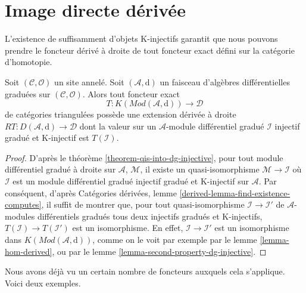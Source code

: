 \section{Image directe dérivée}
\label{section-derived-pushforward}

\noindent
L'existence de suffisamment d'objets K-injectifs garantit que nous pouvons prendre le foncteur dérivé à droite de tout foncteur exact défini sur la catégorie d'homotopie.

\begin{lemma}
\label{lemma-right-derived}
Soit $(\mathcal{C}, \mathcal{O})$ un site annelé.
Soit $(\mathcal{A}, \text{d})$ un faisceau d'algèbres différentielles graduées sur $(\mathcal{C}, \mathcal{O})$.
Alors tout foncteur exact
$$
T : K(\textit{Mod}(\mathcal{A}, \text{d})) \longrightarrow \mathcal{D}
$$
de catégories triangulées possède une extension dérivée à droite $RT : D(\mathcal{A}, \text{d}) \to \mathcal{D}$ dont la valeur sur un $\mathcal{A}$-module différentiel gradué $\mathcal{I}$ injectif gradué et K-injectif est $T(\mathcal{I})$.
\end{lemma}

\begin{proof}
D'après le théorème \ref{theorem-qis-into-dg-injective}, pour tout module différentiel gradué à droite sur $\mathcal{A}$, $\mathcal{M}$, il existe un quasi-isomorphisme $\mathcal{M} \to \mathcal{I}$ où $\mathcal{I}$ est un module différentiel gradué injectif gradué et K-injectif sur $\mathcal{A}$.
Par conséquent, d'après Catégories dérivées, lemme \ref{derived-lemma-find-existence-computes}, il suffit de montrer que, pour tout quasi-isomorphisme $\mathcal{I} \to \mathcal{I}'$ de $\mathcal{A}$-modules différentiels gradués tous deux injectifs gradués et K-injectifs, $T(\mathcal{I}) \to T(\mathcal{I}')$ est un isomorphisme.
En effet, $\mathcal{I} \to \mathcal{I}'$ est un isomorphisme dans $K(\textit{Mod}(\mathcal{A}, \text{d}))$, comme on le voit par exemple par le lemme \ref{lemma-hom-derived}, ou par le lemme \ref{lemma-second-property-dg-injective}.
\end{proof}

\noindent
Nous avons déjà vu un certain nombre de foncteurs auxquels cela s'applique.
Voici deux exemples.

